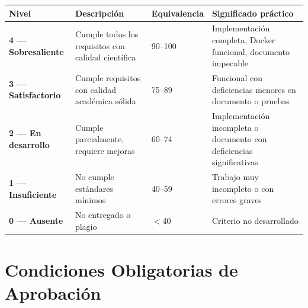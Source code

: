 \documentclass[11pt,a4paper,landscape]{article}
\begin{document}
	\begin{center}
		\begin{tabular}{|C{4cm}|P{8cm}|C{2.5cm}|P{8cm}|}
			\hline
			\color{white}\textbf{Nivel} & \color{white}\textbf{Descripci\'on} & \color{white}\textbf{Equivalencia} & \color{white}\textbf{Significado pr\'actico}\\
			\hline
			 \textbf{4 --- Sobresaliente} & Cumple todos los requisitos con calidad cient\'ifica & 90--100 & Implementaci\'on completa, Docker funcional, documento impecable\\
			\hline
			 \textbf{3 --- Satisfactorio} & Cumple requisitos con calidad acad\'emica s\'olida & 75--89 & Funcional con deficiencias menores en documento o pruebas\\
			\hline
			 \textbf{2 --- En desarrollo} & Cumple parcialmente, requiere mejoras & 60--74 & Implementaci\'on incompleta o documento con deficiencias significativas\\
			\hline
			 \textbf{1 --- Insuficiente} & No cumple est\'andares m\'inimos & 40--59 & Trabajo muy incompleto o con errores graves\\
			\hline
			 \textbf{0 --- Ausente} & No entregado o plagio & $<$40 & Criterio no desarrollado\\
			\hline
		\end{tabular}
	\end{center}
	
	\vspace{4pt}
	
	\section{Condiciones Obligatorias de Aprobaci\'on}
	
\end{document}
